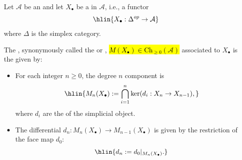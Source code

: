 \begin{definition} \label{definition:moore_complex_of_a_simplicial_object_in_an_abelian_category}
    Let $\mathcal{A}$ be an  and let $X_\bullet$ be a  in $\mathcal{A}$, i.e., a functor
    $$\hlin{X_\bullet: \Delta^{op} \to \mathcal{A}}$$
    where $\Delta$ is the simplex category.

    The , synonymously called the  or , \hl{$M(X_\bullet) \in \mathrm{Ch}_{\geq 0}(\mathcal{A})$} associated to $X_\bullet$ is the  given by:
    \begin{itemize}
        \item For each integer $n \geq 0$, the degree $n$ component is
        $$\hlin{M_n(X_\bullet) := \bigcap_{i=1}^n \ker (d_i: X_n \to X_{n-1}),}$$
        where $d_i$ are the  of the simplicial object.
        \item The differential $d_n: M_n(X_\bullet) \to M_{n-1}(X_\bullet)$ is given by the restriction of the face map $d_0$:
        $$\hlin{d_n := d_0|_{M_n(X_\bullet)}.}$$
    \end{itemize}
\end{definition}